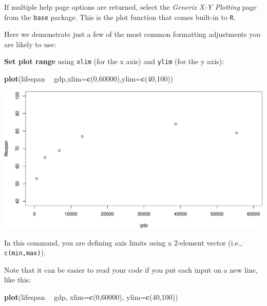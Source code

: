 \documentclass[]{book}
\newenvironment{Shaded}{\begin{snugshade}}{\end{snugshade}}
\newcommand{\DataTypeTok}[1]{\textcolor[rgb]{0.13,0.29,0.53}{#1}}
\newcommand{\DecValTok}[1]{\textcolor[rgb]{0.00,0.00,0.81}{#1}}
\newcommand{\KeywordTok}[1]{\textcolor[rgb]{0.13,0.29,0.53}{\textbf{#1}}}
\newcommand{\NormalTok}[1]{#1}
\newcommand{\OperatorTok}[1]{\textcolor[rgb]{0.81,0.36,0.00}{\textbf{#1}}}
\newcommand{\StringTok}[1]{\textcolor[rgb]{0.31,0.60,0.02}{#1}}
\begin{document}
If multiple help page options are returned, select the \emph{Generiz X-Y Plotting} page from the \texttt{base} package. This is the plot function that comes built-in to \texttt{R}.

Here we demonstrate just a few of the most common formatting adjustments you are likely to use:

\textbf{Set plot range} using \texttt{xlim} (for the x axis) and \texttt{ylim} (for the y axis):

\begin{Shaded}
\begin{Highlighting}[]
\KeywordTok{plot}\NormalTok{(lifespan }\OperatorTok{~}\StringTok{ }\NormalTok{gdp,}\DataTypeTok{xlim=}\KeywordTok{c}\NormalTok{(}\DecValTok{0}\NormalTok{,}\DecValTok{60000}\NormalTok{),}\DataTypeTok{ylim=}\KeywordTok{c}\NormalTok{(}\DecValTok{40}\NormalTok{,}\DecValTok{100}\NormalTok{))}
\end{Highlighting}
\end{Shaded}

\includegraphics{figures/unnamed-chunk-227-1.pdf}

In this command, you are defining axis limits using a 2-element vector (i.e., \texttt{c(min,max)}).

Note that it can be easier to read your code if you put each input on a new line, like this:

\begin{Shaded}
\begin{Highlighting}[]
\KeywordTok{plot}\NormalTok{(lifespan }\OperatorTok{~}\StringTok{ }\NormalTok{gdp,}
     \DataTypeTok{xlim=}\KeywordTok{c}\NormalTok{(}\DecValTok{0}\NormalTok{,}\DecValTok{60000}\NormalTok{),}
     \DataTypeTok{ylim=}\KeywordTok{c}\NormalTok{(}\DecValTok{40}\NormalTok{,}\DecValTok{100}\NormalTok{))}
\end{Highlighting}
\end{Shaded}
\end{document}
